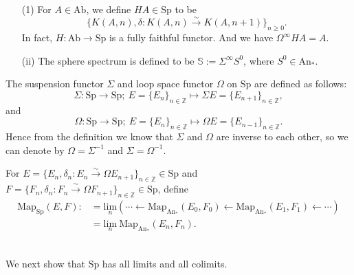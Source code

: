 \documentclass[UTF8,12,a4paper]{ctexart}
\theoremstyle{definition}
\newcommand{\An}{\text{An}}
\newcommand{\Sp}{\text{Sp}}
\begin{document}
\exm 
\begin{itemize}
	\item [(1)]
	For $A\in\text{Ab}$, we define $HA\in \Sp$ to be
	$$
	\{K(A,n), \delta: K(A,n)\stackrel{\sim}{\rightarrow} K(A,n+1) \}_{n\geq 0}.
	$$
	In fact, $H:\text{Ab}\rightarrow \Sp$ is a fully faithful functor. And we have $\Omega^\infty HA=A.$
      \item [(ii)] The sphere spectrum is defined to be
$\mathbb{S}:=\Sigma^\infty S^0$, where $S^0\in \An_*.$ 
\end{itemize}






\dfn 
The suspension functor $\Sigma$ and loop space functor $\Omega$ on $\Sp$ are defined as follows:
$$
\Sigma:\Sp\rightarrow \Sp;\ 
E=\{E_n \}_{n\in\mathbb{Z}}
\mapsto 
\Sigma E=\{E_{n+1}\}_{n\in \mathbb{Z}},
$$
and
$$
\Omega:\Sp\rightarrow \Sp;\ 
E=\{E_n \}_{n\in\mathbb{Z}}
\mapsto 
\Omega E=\{E_{n-1}\}_{n\in \mathbb{Z}}.
$$
Hence from the definition we know that $\Sigma$ and $\Omega$ are inverse to each other, so we can denote by $\Omega=\Sigma^{-1}$ and $\Sigma=\Omega^{-1}.$

\dfn 
For $E=\{E_n,\delta_n: E_n\stackrel{\sim}{\rightarrow}\Omega E_{n+1} \}_{n\in\mathbb{Z}}\in \Sp$ and 
$F=\{F_n,\delta_n: F_n\stackrel{\sim}{\rightarrow}\Omega F_{n+1} \}_{n\in\mathbb{Z}}\in \Sp$, define
\begin{align*}
\text{Map}_\Sp(E,F)
:&=
\underset{n}{\text{lim}}
(\cdots \leftarrow \text{Map}_{\An_*}(E_0,F_0)\leftarrow
\text{Map}_{\An_*}(E_1,F_1)\leftarrow\cdots)\\
&=\underset{n}{\text{lim}}\ \text{Map}_{\An_*}(E_n,F_n).
\end{align*}


~\\
We next show that $\Sp$ has all limits and all colimits.
\end{document}

